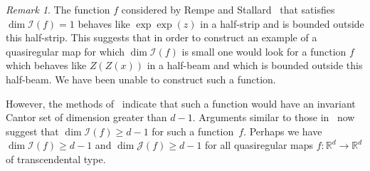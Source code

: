 \documentclass[12pt,a4paper]{amsart}
\theoremstyle{plain}
\theoremstyle{definition}
\theoremstyle{remark}
\newtheorem{remark}[theorem]{Remark}
\def\R{\mathbb R}
\def\cI{\mathcal I}
\def\cJ{\mathcal J}
\numberwithin{equation}{section}
\begin{document}
\begin{remark}\label{dimI}
The function $f$ considered by Rempe and Stallard~\cite{Rempe2010}
that satisfies $\dim\cI(f)=1$ behaves 
like $\exp\exp(z)$ in a half-strip and is bounded outside  this half-strip.
This suggests that in order to construct an example of a quasiregular map
for which $\dim\cI(f)$ is small one would look for a function $f$ which behaves
like $Z(Z(x))$ in a half-beam and which is bounded outside this half-beam.
We have been unable to construct such a function. 
	
However, the methods of~\cite[\S~4]{BD} indicate that such a function would 
have an invariant Cantor set of dimension greater than $d-1$. 
Arguments similar to those in~\cite{BP} now suggest that $\dim\cI(f)\geq d-1$ 
for such a function~$f$.
Perhaps we have $\dim\cI(f)\geq d-1$ and $\dim\cJ(f)\geq d-1$ 
for all quasiregular maps $f\colon\R^d\to\R^d$ of transcendental type.
\end{remark}
\end{document}
